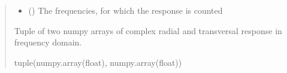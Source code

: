 \documentclass[letterpaper,10pt,english]{sphinxmanual}
\begin{document}
\begin{fulllineitems}
\begin{quote}
\begin{description}
\begin{itemize}
\item {} 
\sphinxAtStartPar
{} (\sphinxstyleliteralemphasis{\sphinxupquote{(}}\sphinxstyleliteralemphasis{\sphinxupquote{)}}) \textendash{} The frequencies, for which the response is counted

\end{itemize}

\sphinxAtStartPar
Tuple of two numpy arrays of complex radial and transversal response in frequency domain.

\sphinxAtStartPar
tuple(numpy.array(float), numpy.array(float))

\end{description}\end{quote}

\end{fulllineitems}

\end{document}
